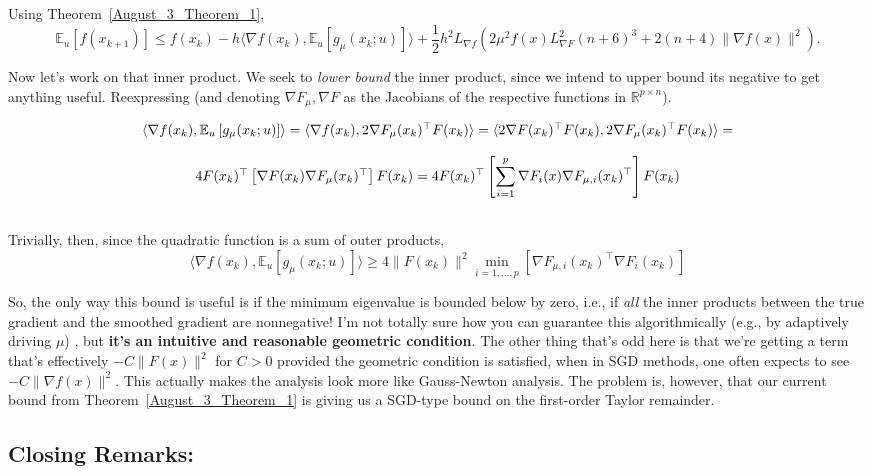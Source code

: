 \documentclass{article}
\begin{document}
Using Theorem~\ref{August_3_Theorem_1}, 
$$\mathbb{E}_{u} \left[f(x_{k+1})\right] \leq f(x_k) - h\langle\nabla f(x_k), \mathbb{E}_u \left[g_{\mu}(x_k;u)\right]\rangle + \frac{1}{2}h^2 L_{\nabla f}\left(2\mu^2f(x)L_{\nabla F}^2(n+6)^3 + 2(n+4)\|\nabla f(x)\|^2\right).$$

Now let's work on that inner product. 
We seek to \emph{lower bound} the inner product, since we intend to upper bound its negative to get anything useful. 
Reexpressing (and denoting $\nabla F_{\mu}, \nabla F$ as the Jacobians of the respective functions in $\mathbb{R}^{p\times n}$). 

$$\begin{array}{c}\vspace{1pc}
\langle\nabla f(x_k), \mathbb{E}_u \left[g_{\mu}(x_k;u)\right]\rangle = 
\langle \nabla f(x_k), 2\nabla F_{\mu}(x_k)^\top  F(x_k)\rangle =
\langle 2\nabla F(x_k)^\top F(x_k), 2\nabla F_{\mu}(x_k)^\top F(x_k)\rangle =\\
\vspace{1pc}

4F(x_k)^\top \left[\nabla F(x_k)\nabla F_{\mu}(x_k)^\top\right] F(x_k) =
4F(x_k)^\top \left[\displaystyle\sum_{i=1}^p \nabla F_{i}(x)\nabla F_{\mu,i}(x_k)^\top \right]F(x_k)
\end{array}$$

Trivially, then, since the quadratic function is a sum of outer products, 
$$\langle\nabla f(x_k), \mathbb{E}_u \left[g_{\mu}(x_k;u)\right]\rangle
\geq 4\|F(x_k)\|^2 \displaystyle\min_{i=1,\dots,p} \left[\nabla F_{\mu,i}(x_k)^\top \nabla F_i(x_k)\right]$$

So, the only way this bound is useful is if the minimum eigenvalue is bounded below by zero, i.e.,
if \emph{all} the inner products between the true gradient and the smoothed gradient are nonnegative!
I'm not totally sure how you can guarantee this algorithmically (e.g., by adaptively driving $\mu$) , but \textbf{it's an intuitive and reasonable geometric condition}. The other thing that's odd here is that we're getting a term that's effectively
$-C\|F(x)\|^2$ for $C>0$ provided the geometric condition is satisfied, when in SGD methods, one often expects to see $-C\|\nabla f(x)\|^2.$ This actually makes the analysis look more like Gauss-Newton analysis. The problem is, however, that our current bound from Theorem~\ref{August_3_Theorem_1} is giving us a SGD-type bound on the first-order Taylor remainder. 


\subsection{Closing Remarks:}
\end{document}
